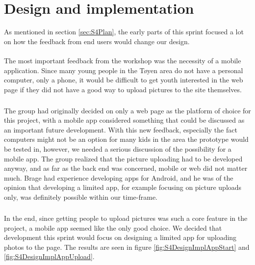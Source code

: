 \section{Design and implementation}
\label{sec:S4DesignImpl}

As mentioned in section \ref{sec:S4Plan}, the early parts of this sprint focused a lot on how the feedback from end users would change our design.

\paragraph{} The most important feedback from the workshop was the necessity of a mobile application. Since many young people in the T\o yen area do not have a personal computer, only a phone, it would be difficult to get youth interested in the web page if they did not have a good way to upload pictures to the site themselves.
\subparagraph{} The group had originally decided on only a web page as the platform of choice for this project, with a mobile app considered something that could be discussed as an important future development. With this new feedback, especially the fact computers might not be an option for many kids in the area the prototype would be tested in, however, we needed a serious discussion of the possibility for a mobile app. The group realized that the picture uploading had to be developed anyway, and as far as the back end was concerned, mobile or web did not matter much. Brage had experience developing apps for Android, and he was of the opinion that developing a limited app, for example focusing on picture uploads only, was definitely possible within our time-frame.
\subparagraph{} In the end, since getting people to upload pictures was such a core feature in the project, a mobile app seemed like the only good choice. We decided that development this sprint would focus on designing a limited app for uploading photos to the page. The results are seen in figure \ref{fig:S4DesignImplAppStart} and \ref{fig:S4DesignImplAppUpload}.

